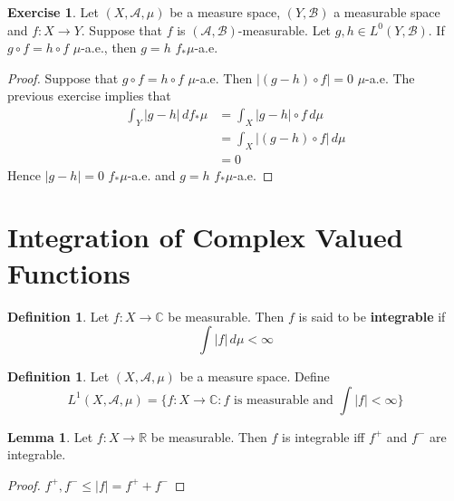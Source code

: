 \documentclass{book}
\theoremstyle{definition}
\newtheorem{defn}[definition]{Definition}
\newtheorem{lem}[definition]{Lemma}
\newtheorem{ex}[definition]{Exercise}
\newcommand{\C}{\mathbb{C}}
\newcommand{\R}{\mathbb{R}}
\newcommand{\MA}{\mathcal{A}}
\newcommand{\MB}{\mathcal{B}}
\newcommand{\ld}[1]{\label{defn:#1}}
\DeclareMathOperator*{\0}{\mbf{0}}
\DeclareMathOperator*{\1}{\mbf{1}}
\newcommand{\dmu}{\, d \mu}
\begin{document}
	\begin{ex}
		Let $(X, \MA, \mu)$ be a measure space, $(Y, \MB)$ a measurable space and $f: X \rightarrow Y$. Suppose that $f$ is $(\MA, \MB)$-measurable. Let $g, h \in L^0(Y, \MB)$. If $g \circ f = h \circ f$ $\mu$-a.e., then $g = h$ $f_*\mu$-a.e.
	\end{ex}

	\begin{proof}
		Suppose that $g \circ f = h \circ f$ $\mu$-a.e. Then $|(g - h) \circ f| = 0$ $\mu$-a.e. The previous exercise implies that 
		\begin{align*}
			\int_Y |g - h|  \, d f_*\mu 
			& = \int_X |g - h| \circ f \dmu \\
			& = \int_X |(g - h) \circ f| \dmu \\
			& = 0
		\end{align*}
		Hence $|g - h| = 0$ $f_*\mu$-a.e. and $g = h$ $f_*\mu$-a.e.
	\end{proof}

	
	
	
	
	
	
	
	
	
	
	
	
	
	
	
	
	\newpage
	\section{Integration of Complex Valued Functions}
	
	\begin{defn} \ld{00000} 
		Let $f:X \rightarrow \C$ be measurable. Then $f$ is said to be \textbf{integrable} if $$\int |f| \dmu < \infty$$
	\end{defn}
	
	\begin{defn} \ld{00000} 
		Let $(X, \MA, \mu)$ be a measure space. Define $$L^1(X, \MA, \mu) = \bigg \{f:X \rightarrow \C : f \text{ is measurable and } \int |f| < \infty \bigg \}$$
	\end{defn}
	
	\begin{lem}
		Let $f:X \rightarrow \R$ be measurable. Then $f$ is integrable iff $f^+$ and $f^-$ are integrable. 
	\end{lem}
	
	\begin{proof}
		$f^+,f^- \leq |f| = f^+ + f^-$
	\end{proof}
	
\end{document}
